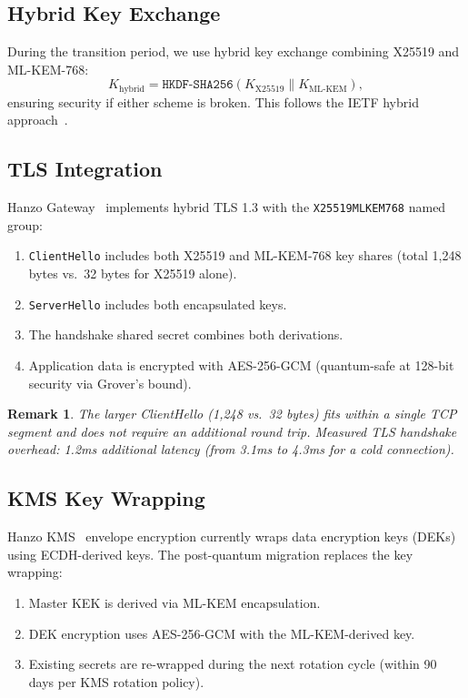 \documentclass[11pt]{article}
\newtheorem{remark}{Remark}
\begin{document}
\subsection{Hybrid Key Exchange}

During the transition period, we use hybrid key exchange combining X25519 and
ML-KEM-768:
\begin{equation}
K_{\text{hybrid}} = \texttt{HKDF-SHA256}(K_{\text{X25519}} \| K_{\text{ML-KEM}}),
\end{equation}
ensuring security if either scheme is broken. This follows the IETF hybrid
approach~\cite{hybridtls}.

\subsection{TLS Integration}

Hanzo Gateway~\cite{hanzogateway} implements hybrid TLS 1.3 with the
\texttt{X25519MLKEM768} named group:
\begin{enumerate}[leftmargin=1.4em]
    \item \texttt{ClientHello} includes both X25519 and ML-KEM-768 key shares
    (total 1,248 bytes vs.\ 32 bytes for X25519 alone).
    \item \texttt{ServerHello} includes both encapsulated keys.
    \item The handshake shared secret combines both derivations.
    \item Application data is encrypted with AES-256-GCM (quantum-safe at
    128-bit security via Grover's bound).
\end{enumerate}

\begin{remark}
The larger ClientHello (1,248 vs.\ 32 bytes) fits within a single TCP segment
and does not require an additional round trip. Measured TLS handshake overhead:
1.2ms additional latency (from 3.1ms to 4.3ms for a cold connection).
\end{remark}

\subsection{KMS Key Wrapping}

Hanzo KMS~\cite{hanzokms} envelope encryption currently wraps data encryption
keys (DEKs) using ECDH-derived keys. The post-quantum migration replaces the
key wrapping:
\begin{enumerate}[leftmargin=1.4em]
    \item Master KEK is derived via ML-KEM encapsulation.
    \item DEK encryption uses AES-256-GCM with the ML-KEM-derived key.
    \item Existing secrets are re-wrapped during the next rotation cycle
    (within 90 days per KMS rotation policy).
\end{enumerate}
\end{document}
